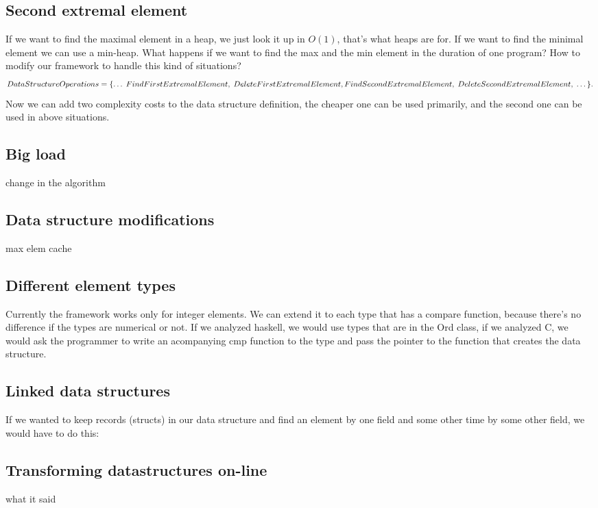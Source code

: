 \documentclass[11pt]{article}
\begin{document}
	\subsection{Second extremal element}
		If we want to find the maximal element in a heap, we just look it up in $O(1)$, that's what heaps are for. 
		If we want to find the minimal element we can use a min-heap. What happens if we want to find the max and the min element in the duration of one program? 
		How to modify our framework to handle this kind of situations?
		\begin{equation}
		  	DataStructureOperations = \{\dots \; FindFirstExtremalElement,\; DeleteFirstExtremalElement, \; \\
			FindSecondExtremalElement,\; DeleteSecondExtremalElement, \; \dots\}.
		\end{equation}
		Now we can add two complexity costs to the data structure definition, the cheaper one can be used primarily, and the second one can be used in above situations.
	\subsection{Big load}
		change in the algorithm
	\subsection{Data structure modifications}
		
		max elem cache
	\subsection{Different element types}
		Currently the framework works only for integer elements. We can extend it to each type that has a compare function,
		because there's no difference if the types are numerical or not.
		If we analyzed haskell, we would use types that are in the Ord class,
		if we analyzed C, we would ask the programmer to write an acompanying cmp function to the type and pass the pointer to the function that creates the data structure.
	\subsection{Linked data structures}
		If we wanted to keep records (structs) in our data structure and find an element by one field and some other time by some other field, we would have to do this:
	\subsection{Transforming datastructures on-line}
		what it said
\end{document}
